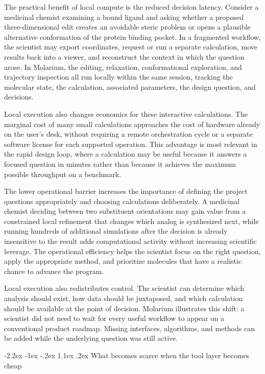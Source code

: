 \documentclass[11pt]{article}
\makeatletter
\renewcommand\section{\@startsection{section}{1}{\z@}%
  {-2.2ex \@plus -1ex \@minus -.2ex}%
  {1.1ex \@plus .2ex}%
  {\normalfont\Large\bfseries\color{molblue}}}
\makeatother
\begin{document}
The practical benefit of local compute is the reduced decision latency. Consider a medicinal chemist examining a bound ligand and asking whether a proposed three-dimensional edit creates an avoidable steric problem or opens a plausible alternative conformation of the protein binding pocket. In a fragmented workflow, the scientist may export coordinates, request or run a separate calculation, move results back into a viewer, and reconstruct the context in which the question arose. In Molarium, the editing, relaxation, conformational exploration, and trajectory inspection all run locally within the same session, tracking the molecular state, the calculation, associated parameters, the design question, and decisions.

Local execution also changes economics for these interactive calculations. The marginal cost of many small calculations approaches the cost of hardware already on the user's desk, without requiring a remote orchestration cycle or a separate software license for each supported operation. This advantage is most relevant in the rapid design loop, where a calculation may be useful because it answers a focused question in minutes rather than because it achieves the maximum possible throughput on a benchmark.

The lower operational barrier increases the importance of defining the project questions appropriately and choosing calculations deliberately. A medicinal chemist deciding between two substituent orientations may gain value from a constrained local refinement that changes which analog is synthesized next, while running hundreds of additional simulations after the decision is already insensitive to the result adds computational activity without increasing scientific leverage. The operational efficiency helps the scientist focus on the right question, apply the appropriate method, and prioritize molecules that have a realistic chance to advance the program.

Local execution also redistributes control. The scientist can determine which analysis should exist, how data should be juxtaposed, and which calculation should be available at the point of decision. Molarium illustrates this shift: a scientist did not need to wait for every useful workflow to appear on a conventional product roadmap. Missing interfaces, algorithms, and methods can be added while the underlying question was still active.

\section{What becomes scarce when the tool layer becomes cheap}
\end{document}
